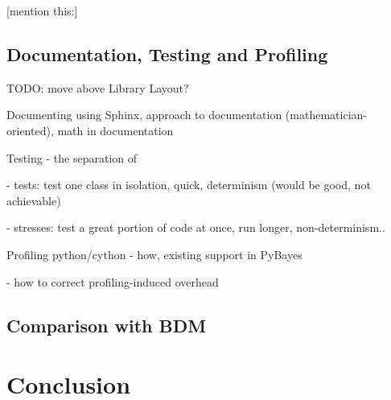 \documentclass[a4paper,12pt,oneside]{report}
\newif\ifrelease %
\begin{document}
[mention this:\cite{Smi:10}]

\section{Documentation, Testing and Profiling}

TODO: move above Library Layout?

Documenting using Sphinx, approach to documentation (mathematician-oriented), math in documentation

Testing - the separation of

- tests: test one class in isolation, quick, determinism (would be good, not achievable)

- stresses: test a great portion of code at once, run longer, non-determinism..

Profiling python/cython - how, existing support in PyBayes

- how to correct profiling-induced overhead

\section{Comparison with BDM}


\chapter*{Conclusion} 


\clearpage %



\ifrelease
	\appendix %
	\clearpage %
	\phantomsection %
	\addcontentsline{toc}{chapter}{\appendixname}

	\part*{\appendixname}

	
\fi
\end{document}
